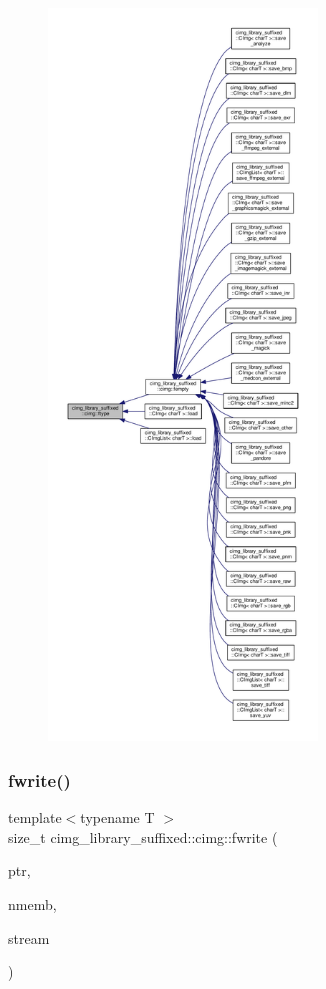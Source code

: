 \begin{figure}[H]
\begin{center}
\leavevmode
\includegraphics[height=550pt]{d4/d9b/namespacecimg__library__suffixed_1_1cimg_a56c2dbfe99d9f6e6bc1be9d03b0ddaaa_icgraph}
\end{center}
\end{figure}
\mbox{\label{namespacecimg__library__suffixed_1_1cimg_ad44a7e96cd1e9cdef83f4ffe235dd1fb}} 
\subsubsection{\texorpdfstring{fwrite()}{fwrite()}}
{\footnotesize\ttfamily template$<$typename T $>$ \\
size\+\_\+t cimg\+\_\+library\+\_\+suffixed\+::cimg\+::fwrite (\begin{DoxyParamCaption}\item[{const T $\ast$}]{ptr,  }\item[{const size\+\_\+t}]{nmemb,  }\item[{std\+::\+F\+I\+LE $\ast$}]{stream }\end{DoxyParamCaption})\hspace{0.3cm}{\ttfamily [inline]}}




